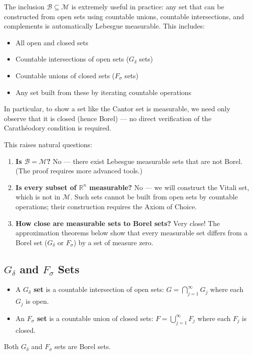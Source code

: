 \documentclass[11pt]{report}
\begin{document}
\begin{rembox}
The inclusion $\mathcal{B} \subseteq \mathcal{M}$ is extremely useful in practice: any set that can be constructed from open sets using countable unions, countable intersections, and complements is automatically Lebesgue measurable. This includes:
\begin{itemize}
    \item All open and closed sets
    \item Countable intersections of open sets ($G_\delta$ sets)
    \item Countable unions of closed sets ($F_\sigma$ sets)
    \item Any set built from these by iterating countable operations
\end{itemize}

In particular, to show a set like the Cantor set is measurable, we need only observe that it is closed (hence Borel) --- no direct verification of the Carath\'{e}odory condition is required.

This raises natural questions:
\begin{enumerate}
    \item \textbf{Is $\mathcal{B} = \mathcal{M}$?} No --- there exist Lebesgue measurable sets that are not Borel. (The proof requires more advanced tools.)
    \item \textbf{Is every subset of $\mathbb{R}^n$ measurable?} No --- we will construct the Vitali set, which is not in $\mathcal{M}$. Such sets cannot be built from open sets by countable operations; their construction requires the Axiom of Choice.
    \item \textbf{How close are measurable sets to Borel sets?} Very close! The approximation theorems below show that every measurable set differs from a Borel set ($G_\delta$ or $F_\sigma$) by a set of measure zero.
\end{enumerate}
\end{rembox}

\subsection{$G_\delta$ and $F_\sigma$ Sets}

\begin{defbox}
\begin{itemize}
    \item A \textbf{$G_\delta$ set} is a countable intersection of open sets: $G = \bigcap_{j=1}^{\infty} G_j$ where each $G_j$ is open.
    \item An \textbf{$F_\sigma$ set} is a countable union of closed sets: $F = \bigcup_{j=1}^{\infty} F_j$ where each $F_j$ is closed.
\end{itemize}
Both $G_\delta$ and $F_\sigma$ sets are Borel sets.
\end{defbox}
\end{document}
